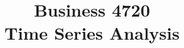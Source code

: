 \documentclass{article}
\title{Business 4720\\ \vspace{\baselineskip}
Time Series Analysis}
\begin{document}
\maketitle

\vfill

\clearpage


\end{document}
